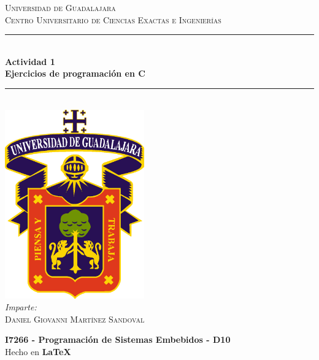 \documentclass[10pt,letterpaper]{article}
\newcommand{\HRule}{\rule{\linewidth}{0.5mm}} %
\begin{document}

\begin{titlepage}
    \center
    
    \textsc{\LARGE Universidad de Guadalajara}\\[0.2cm] %
    \textsc{Centro Universitario de Ciencias Exactas e Ingenierías}\\[1cm]
    
    \HRule \\[0.3cm]
    { 
        \LARGE \textbf{Actividad 1} \\[0.3cm]
        \large \textbf{Ejercicios de programación en C} \\[0.3cm]
    }
    \HRule \\[2cm]
    
    \includegraphics[width=6cm]{logo_udg_color.eps}\\[1.25cm] %
    
    \center
    \vspace{1cm}
    \emph{Imparte:} \\ %
    \textsc{Daniel Giovanni Martínez Sandoval} 
    
    \vfill
    \textbf{I7266 - Programación de Sistemas Embebidos - D10} \\
    Hecho en \textbf{\LaTeX}	
\end{titlepage}



\end{document}
